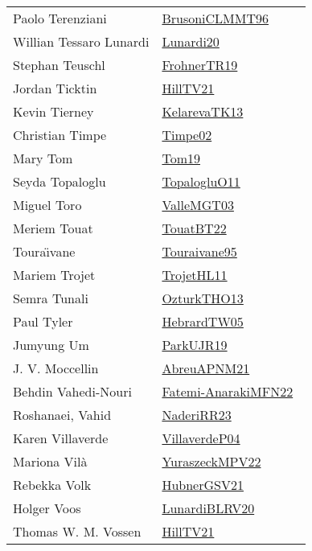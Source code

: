 {\begin{longtable}{p{4cm}p{20cm}}
Paolo Terenziani & \href{works/BrusoniCLMMT96.pdf}{BrusoniCLMMT96}~\cite{BrusoniCLMMT96}\\
Willian Tessaro Lunardi & \href{}{Lunardi20}~\cite{Lunardi20}\\
Stephan Teuschl & \href{works/FrohnerTR19.pdf}{FrohnerTR19}~\cite{FrohnerTR19}\\
Jordan Ticktin & \href{works/HillTV21.pdf}{HillTV21}~\cite{HillTV21}\\
Kevin Tierney & \href{works/KelarevaTK13.pdf}{KelarevaTK13}~\cite{KelarevaTK13}\\
Christian Timpe & \href{works/Timpe02.pdf}{Timpe02}~\cite{Timpe02}\\
Mary Tom & \href{works/Tom19.pdf}{Tom19}~\cite{Tom19}\\
Seyda Topaloglu & \href{works/TopalogluO11.pdf}{TopalogluO11}~\cite{TopalogluO11}\\
Miguel Toro & \href{works/ValleMGT03.pdf}{ValleMGT03}~\cite{ValleMGT03}\\
Meriem Touat & \href{works/TouatBT22.pdf}{TouatBT22}~\cite{TouatBT22}\\
Toura{\"{\i}}vane & \href{works/Touraivane95.pdf}{Touraivane95}~\cite{Touraivane95}\\
Mariem Trojet & \href{works/TrojetHL11.pdf}{TrojetHL11}~\cite{TrojetHL11}\\
Semra Tunali & \href{works/OzturkTHO13.pdf}{OzturkTHO13}~\cite{OzturkTHO13}\\
Paul Tyler & \href{works/HebrardTW05.pdf}{HebrardTW05}~\cite{HebrardTW05}\\
Jumyung Um & \href{works/ParkUJR19.pdf}{ParkUJR19}~\cite{ParkUJR19}\\
J. V. Moccellin & \href{}{AbreuAPNM21}~\cite{AbreuAPNM21}\\
Behdin Vahedi-Nouri & \href{}{Fatemi-AnarakiMFN22}~\cite{Fatemi-AnarakiMFN22}\\
Roshanaei, Vahid & \href{works/NaderiRR23.pdf}{NaderiRR23}~\cite{NaderiRR23}\\
Karen Villaverde & \href{}{VillaverdeP04}~\cite{VillaverdeP04}\\
Mariona Vil{\`a} & \href{works/YuraszeckMPV22.pdf}{YuraszeckMPV22}~\cite{YuraszeckMPV22}\\
Rebekka Volk & \href{works/HubnerGSV21.pdf}{HubnerGSV21}~\cite{HubnerGSV21}\\
Holger Voos & \href{works/LunardiBLRV20.pdf}{LunardiBLRV20}~\cite{LunardiBLRV20}\\
Thomas W. M. Vossen & \href{works/HillTV21.pdf}{HillTV21}~\cite{HillTV21}\\

\end{longtable}}
